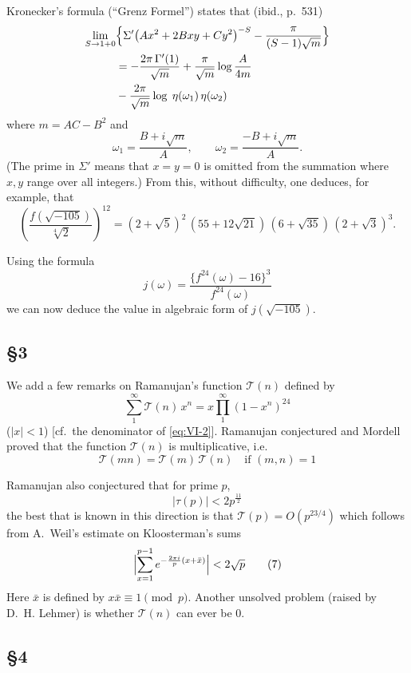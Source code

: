 Kronecker's formula (``Grenz Formel'') states that (ibid., p.~531)
\[
\begin{aligned}
\lim_{S\to 1+0}&\Bigl\{\Sigma'\bigl(Ax^{2}+2Bxy+Cy^{2}\bigr)^{-S}
-\frac{\pi}{(S-1)\sqrt{m}}\Bigr\}\\
&=-\frac{2\pi\,\Gamma'(1)}{\sqrt{m}}+\frac{\pi}{\sqrt{m}}\log\frac{A}{4m}\\
&-\frac{2\pi}{\sqrt{m}}\log\;\eta(\omega_{1})\,\eta(\omega_{2})
\end{aligned}
\]
where $m=AC-B^{2}$ and
\[
\omega_{1}=\frac{B+i\sqrt{m}}{A},\qquad
\omega_{2}=\frac{-B+i\sqrt{m}}{A}.
\]
(The prime in $\Sigma'$ means that $x=y=0$ is omitted from the summation
where $x,y$ range over all integers.) From this, without difficulty, one
deduces, for example, that
\[
\left(\frac{f(\sqrt{-105})}{\sqrt[4]{2}}\right)^{12}
=(2+\sqrt{5})^{2}\,(55+12\sqrt{21})\,(6+\sqrt{35})\,(2+\sqrt{3})^{3}.
\]

Using the formula
\[
j(\omega)=\frac{\bigl\{f^{24}(\omega)-16\bigr\}^{3}}{f^{24}(\omega)}
\]
we can now deduce the value in algebraic form of $j(\sqrt{-105})$.

\subsection*{\texorpdfstring{§3}{§3}}

We add a few remarks on Ramanujan's function $\mathcal{T}(n)$ defined by
\[
\sum_{1}^{\infty}\mathcal{T}(n)\,x^{n}
=x\prod_{1}^{\infty}(1-x^{n})^{24}
\tag{4}\label{eq:VI-4}
\]
($|x|<1$) [cf.\ the denominator of \eqref{eq:VI-2}]. Ramanujan
conjectured and Mordell proved that the function $\mathcal{T}(n)$ is
multiplicative, i.e.
\[
\mathcal{T}(mn)=\mathcal{T}(m)\,\mathcal{T}(n)\quad\text{if }(m,n)=1
\tag{5}\label{eq:VI-5}
\]

Ramanujan also conjectured that for prime $p$,
\[
|\tau(p)|<2p^{\frac{11}{2}}
\tag{6}\label{eq:VI-6}
\]
the best that is known in this direction is that
$\mathcal{T}(p)=O(p^{23/4})$ which follows from A.~Weil's estimate on
Kloosterman's sums
\[
\Bigl|\sum_{x=1}^{p-1}e^{-\frac{2\pi i}{p}(x+\bar{x})}\Bigr|<2\sqrt{p}
\tag{7}\label{eq:VI-7}
\]
Here $\bar{x}$ is defined by $x\bar{x}\equiv 1\pmod{p}$. Another unsolved
problem (raised by D.~H. Lehmer) is whether $\mathcal{T}(n)$ can ever
be $0$.

\subsection*{\texorpdfstring{§4}{§4}}

